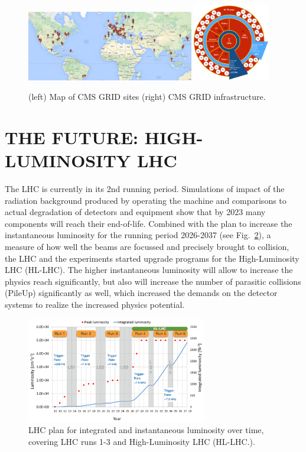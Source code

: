 \documentclass{wscpaperproc}
\theoremstyle{wsc}
\begin{document}
\begin{figure}[htb]
{
   \centering
   \includegraphics[width=0.65\textwidth]{grid}
   \includegraphics[width=0.3\textwidth]{grid2}
   \caption{(left) Map of CMS GRID sites (right) CMS GRID infrastructure.
   \label{fig:grid}}
}
\end{figure}

\section{THE FUTURE: HIGH-LUMINOSITY LHC}
\label{sec:hl-lhc}

The LHC is currently in its 2nd running period. Simulations of impact of the radiation background produced by operating the machine and comparisons to actual degradation of detectors and equipment show that by 2023 many components will reach their end-of-life. Combined with the plan to increase the instantaneous luminosity for the running period 2026-2037 (see Fig.~\ref{fig:hllhc}), a measure of how well the beams are focussed and precisely brought to collision, the LHC and the experiments started upgrade programs for the High-Luminosity LHC (HL-LHC). The higher instantaneous luminosity will allow to increase the physics reach significantly, but also will increase the number of parasitic collisions (PileUp) significantly as well, which increased the demands on the detector systems to realize the increased physics potential. 

\begin{figure}[htb]
{
   \centering
   \includegraphics[width=0.70\textwidth]{hllhc}
   \caption{LHC plan for integrated and instantaneous luminosity over time, covering LHC runs 1-3 and High-Luminosity LHC (HL-LHC.).
   \label{fig:hllhc}}
}
\end{figure}
\end{document}
